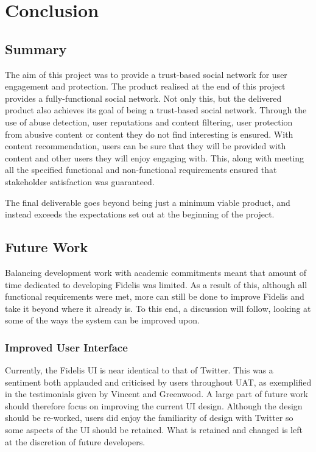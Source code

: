 \chapter{Conclusion}
\label{Chapter:Conclusion}

\section{Summary}
The aim of this project was to provide a trust-based social network for user engagement and protection. The product realised at the end of this project provides a fully-functional social network. Not only this, but the delivered product also achieves its goal of being a trust-based social network. Through the use of abuse detection, user reputations and content filtering, user protection from abusive content or content they do not find interesting is ensured. With content recommendation, users can be sure that they will be provided with content and other users they will enjoy engaging with. This, along with meeting all the specified functional and non-functional requirements ensured that stakeholder satisfaction was guaranteed. 

The final deliverable goes beyond being just a minimum viable product, and instead exceeds the expectations set out at the beginning of the project.

\section{Future Work}
Balancing development work with academic commitments meant that amount of time dedicated to developing Fidelis was limited. As a result of this, although all functional requirements were met, more can still be done to improve Fidelis and take it beyond where it already is. To this end, a discussion will follow, looking at some of the ways the system can be improved upon.

\subsection{Improved User Interface}
Currently, the Fidelis UI is near identical to that of Twitter. This was a sentiment both applauded and criticised by users throughout UAT, as exemplified in the testimonials given by Vincent and Greenwood. A large part of future work should therefore focus on improving the current UI design. Although the design should be re-worked, users did enjoy the familiarity of design with Twitter so some aspects of the UI should be retained. What is retained and changed is left at the discretion of future developers.

